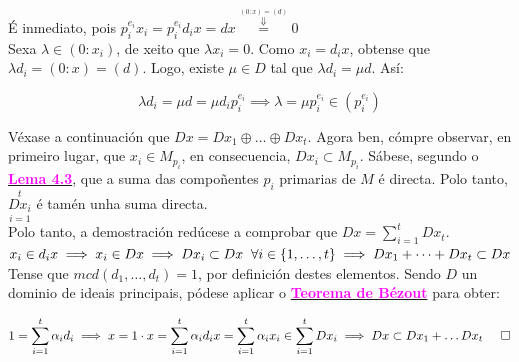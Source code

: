 \documentclass[twoside]{report}
\newcommand{\magbf}[1]{\textcolor{magenta}{\textbf{#1}}} %
\theoremstyle{mystyle}
\begin{document}
\noindent {} É inmediato, pois $p_{i}^{e_{i}}x_{i} = p_{i}^{e_{i}}d_{i}x = dx \overset{\overset{(0:x) = (d)}{\Downarrow}}{=} 0$\\

\noindent {} Sexa $\lambda \in (0 : x_{i})$, de xeito que $\lambda x_{i} = 0$. Como $x_{i} = d_{i}x$, obtense que $\lambda d_{i} = (0 : x) = (d)$. Logo, existe $\mu \in D$ tal que $\lambda d_{i} = \mu d$. Así:

$$\lambda d_{i} = \mu d = \mu d_{i} p_{i}^{e_{i}} \implies \lambda = \mu p_{i}^{e_{i}} \in (p_{i}^{e_{i}})$$

\vspace{2mm}

\noindent Véxase a continuación que $Dx = Dx_{1} \oplus \dots \oplus Dx_{t}$. Agora ben, cómpre observar, en primeiro lugar, que $x_{i} \in M_{p_{i}}$, en consecuencia, $Dx_{i} \subset M_{p_{i}}$. Sábese, segundo o \hyperref[lem4.3]{\magbf{Lema 4.3}}, que a suma das compoñentes $p_{i}$ primarias de $M$ é directa. Polo tanto, $\overset{t}{\underset{i = 1}{Dx_{i}}}$ é tamén unha suma directa.\\

\noindent Polo tanto, a demostración redúcese a comprobar que $Dx = \displaystyle \sum_{i = 1}^{t}Dx_{t}$.\\

\noindent {} $x_{i} \in d_{i}x \implies x_{i} \in Dx \implies Dx_{i} \subset Dx \hspace{2mm} \forall i \in \{1, \dots, t\} \implies Dx_{1} + \dots + Dx_{t} \subset Dx$\\

\noindent {} Tense que $mcd(d_{1}, \dots, d_{t}) = 1$, por definición destes elementos. Sendo $D$ un dominio de ideais principais, pódese aplicar o \hyperref[lem2.2]{\magbf{Teorema de Bézout}} para obter:

$$1 = \displaystyle \sum_{i = 1}^{t}\alpha_{i}d_{i} \implies x = 1 \cdot x = \sum_{i = 1}^{t}\alpha_{i}d_{i}x = \sum_{i = 1}^{t}\alpha_{i}x_{i} \in \sum_{i = 1}^{t}Dx_{i} \implies Dx \subset Dx_{1} + \dots Dx_{t} \hspace{5mm} \square$$

\vspace{3mm}
\end{document}
